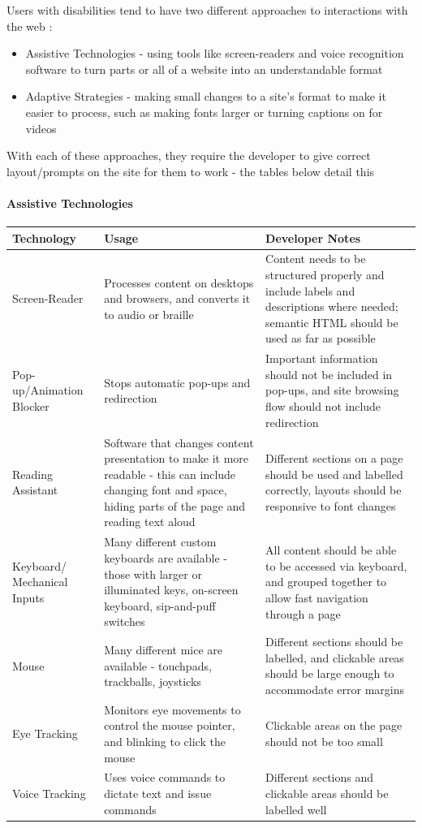 \documentclass[ %
                    author={Aleena Baig},
                supervisor={Dr Simon Lock},
                    degree={BSc},
                     title={On Making Web Accessible Graphs},
                  subtitle={},
                      year={2019} ]{dissertation}
\begin{document}
Users with disabilities tend to have two different approaches to interactions with the web :

\begin{itemize}
    \item Assistive Technologies - using tools like screen-readers and voice recognition software to turn parts or all of a website into an understandable format
    \item Adaptive Strategies - making small changes to a site's format to make it easier to process, such as making fonts larger or turning captions on for videos
\end{itemize}

With each of these approaches, they require the developer to give correct layout/prompts on the site for them to work - the tables below detail this

\paragraph{Assistive Technologies}

\begin{center}
\begin{longtable}{|p{3cm}|p{5cm}|p{5cm}|}
 \hline
 Technology & Usage & Developer Notes \\ [0.5ex]
 \hline \hline
 Screen-Reader & Processes content on desktops and browsers, and converts it to audio or braille & Content needs to be structured properly and include labels and descriptions where needed; semantic HTML should be used as far as possible \\
 \hline
 Pop-up/Animation Blocker & Stops automatic pop-ups and redirection & Important information should not be included in pop-ups, and site browsing flow should not include redirection \\
 \hline
 Reading Assistant & Software that changes content presentation to make it more readable - this can include changing font and space, hiding parts of the page and reading text aloud & Different sections on a page should be used and labelled correctly, layouts should be responsive to font changes \\
 \hline
 Keyboard/ Mechanical Inputs & Many different custom keyboards are available - those with larger or illuminated keys, on-screen keyboard, sip-and-puff switches  & All content should be able to be accessed via keyboard, and grouped together to allow fast navigation through a page \\
 \hline
 Mouse & Many different mice are available - touchpads, trackballs, joysticks & Different sections should be labelled, and clickable areas should be large enough to accommodate error margins\\
 \hline
 Eye Tracking & Monitors eye movements to control the mouse pointer, and blinking to click the mouse & Clickable areas on the page should not be too small \\
 \hline
 Voice Tracking & Uses voice commands to dictate text and issue commands & Different sections and clickable areas should be labelled well \\ [1ex]
 \hline
\end{longtable}
\end{center}
\end{document}
